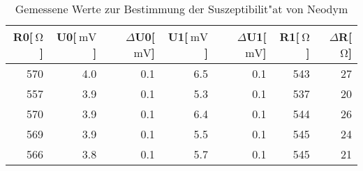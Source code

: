 \begin{table}[!h]
\begin{center}
\begin{tabular}{|r|r|r|r|r|r|r|}
\hline
R0[$\SI{}{\ohm}$] & U0[$\SI{}{\milli\volt}$] & $\Delta$U0[$\SI{}{\milli\volt}$] & U1[$\SI{}{\milli\volt}$] & $\Delta$U1[$\SI{}{\milli\volt}$] & R1[$\SI{}{\ohm}$] & $\Delta$R[$\SI{}{\ohm}$]\\
\hline
\hline

570 & 4.0 & 0.1 & 6.5 & 0.1 & 543 & 27\\
557 & 3.9 & 0.1 & 5.3 & 0.1 & 537 & 20\\
570 & 3.9 & 0.1 & 6.4 & 0.1 & 544 & 26\\
569 & 3.9 & 0.1 & 5.5 & 0.1 & 545 & 24\\
566 & 3.8 & 0.1 & 5.7 & 0.1 & 545 & 21\\

\hline
\end{tabular}
\caption[Messwerte zu Aufgabenteil b]{Gemessene Werte zur Bestimmung der Suszeptibilit"at von Neodym}
\label{tabelle:aufgabe_b_Nd}
\end{center}
\end{table}